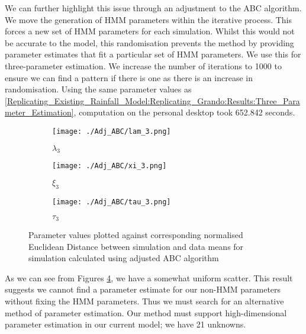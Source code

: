         We can further highlight this issue through an adjustment to the ABC algorithm. We move the generation of HMM parameters within the iterative process. This forces a new set of HMM parameters for each simulation. Whilst this would not be accurate to the model, this randomisation prevents the method by providing parameter estimates that fit a particular set of HMM parameters. We use this for three-parameter estimation. We increase the number of iterations to 1000 to ensure we can find a pattern if there is one as there is an increase in randomisation. Using the same parameter values as \ref{Replicating_Existing_Rainfall_Model:Replicating_Grando:Results:Three_Parameter_Estimation}, computation on the personal desktop took 652.842 seconds.

        \begin{figure}
            \begin{subfigure}{.3\textwidth}
            \centering
            \texttt{[image: ./Adj\_ABC/lam\_3.png]}
            \caption{$\lambda_3$}
            \label{adj:1}
            \end{subfigure}
            \begin{subfigure}{.3\textwidth}
            \centering
            \texttt{[image: ./Adj\_ABC/xi\_3.png]}
            \caption{$\xi_3$}
            \label{adj:2}
            \end{subfigure}
            \begin{subfigure}{.3\textwidth}
                \centering
                \texttt{[image: ./Adj\_ABC/tau\_3.png]}
                \caption{$\tau_3$}
                \label{adj:3}
            \end{subfigure}

            \caption{Parameter values plotted against corresponding normalised Euclidean Distance between simulation and data means for simulation calculated using adjusted ABC algorithm}
            \label{adj}
        \end{figure}


        As we can see from Figures \ref{adj}, we have a somewhat uniform scatter. This result suggests we cannot find a parameter estimate for our non-HMM parameters without fixing the HMM parameters. Thus we must search for an alternative method of parameter estimation. Our method must support high-dimensional parameter estimation in our current model; we have 21 unknowns.
        




